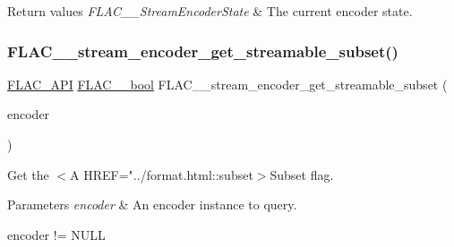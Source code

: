 \begin{DoxyRetVals}{Return values}
{\em F\+L\+A\+C\+\_\+\+\_\+\+Stream\+Encoder\+State} & The current encoder state. \\
\hline
\end{DoxyRetVals}
\mbox{\label{group__flac__stream__encoder_gabafaf69ed39c25c5b1c03044c1a91d66}} 
\subsubsection{\texorpdfstring{F\+L\+A\+C\+\_\+\+\_\+stream\+\_\+encoder\+\_\+get\+\_\+streamable\+\_\+subset()}{FLAC\_\_stream\_encoder\_get\_streamable\_subset()}}
{\footnotesize\ttfamily \hyperlink{group__flac__export_ga56ca07df8a23310707732b1c0007d6f5}{F\+L\+A\+C\+\_\+\+A\+PI} \hyperlink{ordinals_8h_a95103469f1cbd78b8cf250194985b34e}{F\+L\+A\+C\+\_\+\+\_\+bool} F\+L\+A\+C\+\_\+\+\_\+stream\+\_\+encoder\+\_\+get\+\_\+streamable\+\_\+subset (\begin{DoxyParamCaption}\item[{\hyperlink{zconf_8h_a2c212835823e3c54a8ab6d95c652660e}{const} \hyperlink{struct_f_l_a_c_____stream_encoder}{F\+L\+A\+C\+\_\+\+\_\+\+Stream\+Encoder} $\ast$}]{encoder }\end{DoxyParamCaption})}

Get the $<$A H\+R\+EF="../format.html\+::subset$>$Subset flag.


\begin{DoxyParams}{Parameters}
{\em encoder} & An encoder instance to query.  
\begin{DoxyCode}
encoder != NULL 
\end{DoxyCode}
 \\
\hline
\end{DoxyParams}

